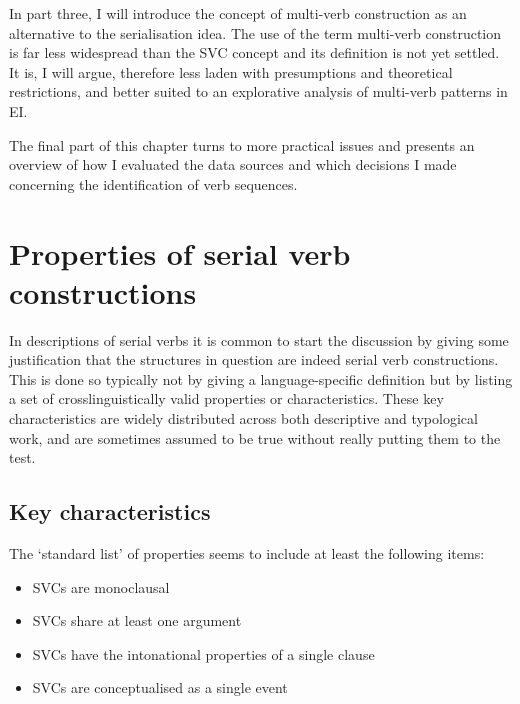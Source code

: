 In part three, I will introduce the concept of multi-verb construction as an alternative to the serialisation idea. The use of the term multi-verb construction is far less widespread than the SVC concept and its definition is not yet settled. It is, I will argue, therefore less laden with presumptions and theoretical restrictions, and better suited to an explorative analysis of multi-verb patterns in EI. 

The final part of this chapter turns to more practical issues and presents an overview of how I evaluated the data sources and which decisions I made concerning the identification of verb sequences. 

\section{Properties of serial verb constructions} \label{section:properties}

In descriptions of serial verbs it is common to start the discussion by giving some justification that the structures in question are indeed serial verb constructions. This is done so typically not by giving a language-specific definition but by listing a set of crosslinguistically valid properties or characteristics. These key characteristics are widely distributed across both descriptive and typological work, and are sometimes assumed to be true without really putting them to the test. 

\subsection{Key characteristics} \label{subsection:keychars}

The `standard list' of properties seems to include at least the following items:

\begin{itemize}
\item SVCs are monoclausal
\item SVCs share at least one argument
\item SVCs have the intonational properties of a single clause
\item SVCs are conceptualised as a single event
\end{itemize}

